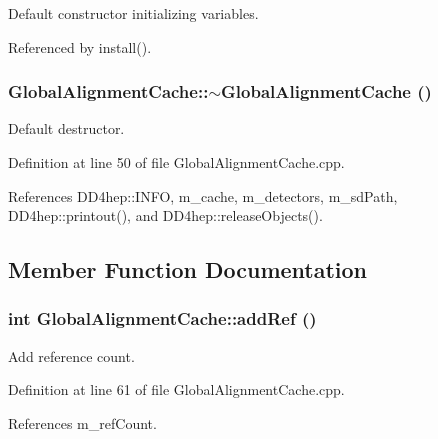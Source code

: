 Default constructor initializing variables. 

Referenced by install().\hypertarget{class_d_d4hep_1_1_alignments_1_1_global_alignment_cache_a130666c02ddc1ffee8ae3d0da29dea49}{
\subsubsection[{$\sim$GlobalAlignmentCache}]{\setlength{\rightskip}{0pt plus 5cm}GlobalAlignmentCache::$\sim$GlobalAlignmentCache ()}}
\label{class_d_d4hep_1_1_alignments_1_1_global_alignment_cache_a130666c02ddc1ffee8ae3d0da29dea49}


Default destructor. 

Definition at line 50 of file GlobalAlignmentCache.cpp.

References DD4hep::INFO, m\_\-cache, m\_\-detectors, m\_\-sdPath, DD4hep::printout(), and DD4hep::releaseObjects().

\subsection{Member Function Documentation}
\hypertarget{class_d_d4hep_1_1_alignments_1_1_global_alignment_cache_a51e8931621f844f3f81517f221b5fe98}{
\subsubsection[{addRef}]{\setlength{\rightskip}{0pt plus 5cm}int GlobalAlignmentCache::addRef ()}}
\label{class_d_d4hep_1_1_alignments_1_1_global_alignment_cache_a51e8931621f844f3f81517f221b5fe98}


Add reference count. 

Definition at line 61 of file GlobalAlignmentCache.cpp.

References m\_\-refCount.

